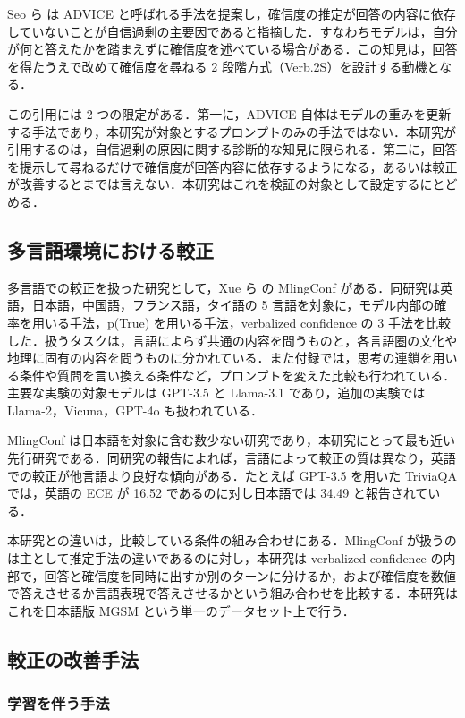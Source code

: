 Seo ら \cite{seo2025advice} は ADVICE と呼ばれる手法を提案し，確信度の推定が回答の内容に依存していないことが自信過剰の主要因であると指摘した．すなわちモデルは，自分が何と答えたかを踏まえずに確信度を述べている場合がある．この知見は，回答を得たうえで改めて確信度を尋ねる 2 段階方式（Verb.2S）を設計する動機となる．

この引用には 2 つの限定がある．第一に，ADVICE 自体はモデルの重みを更新する手法であり，本研究が対象とするプロンプトのみの手法ではない．本研究が引用するのは，自信過剰の原因に関する診断的な知見に限られる．第二に，回答を提示して尋ねるだけで確信度が回答内容に依存するようになる，あるいは較正が改善するとまでは言えない．本研究はこれを検証の対象として設定するにとどめる．

\subsection{多言語環境における較正}

多言語での較正を扱った研究として，Xue ら \cite{xue2025mlingconf} の MlingConf がある．同研究は英語，日本語，中国語，フランス語，タイ語の 5 言語を対象に，モデル内部の確率を用いる手法，p(True) を用いる手法，verbalized confidence の 3 手法を比較した．扱うタスクは，言語によらず共通の内容を問うものと，各言語圏の文化や地理に固有の内容を問うものに分かれている．また付録では，思考の連鎖を用いる条件や質問を言い換える条件など，プロンプトを変えた比較も行われている．主要な実験の対象モデルは GPT-3.5 と Llama-3.1 であり，追加の実験ではLlama-2，Vicuna，GPT-4o も扱われている．

MlingConf は日本語を対象に含む数少ない研究であり，本研究にとって最も近い先行研究である．同研究の報告によれば，言語によって較正の質は異なり，英語での較正が他言語より良好な傾向がある．たとえば GPT-3.5 を用いた TriviaQA では，英語の ECE が 16.52 であるのに対し日本語では 34.49 と報告されている．

本研究との違いは，比較している条件の組み合わせにある．MlingConf が扱うのは主として推定手法の違いであるのに対し，本研究は verbalized confidence の内部で，回答と確信度を同時に出すか別のターンに分けるか，および確信度を数値で答えさせるか言語表現で答えさせるかという組み合わせを比較する．本研究はこれを日本語版 MGSM という単一のデータセット上で行う．

\subsection{較正の改善手法}

\subsubsection{学習を伴う手法}

